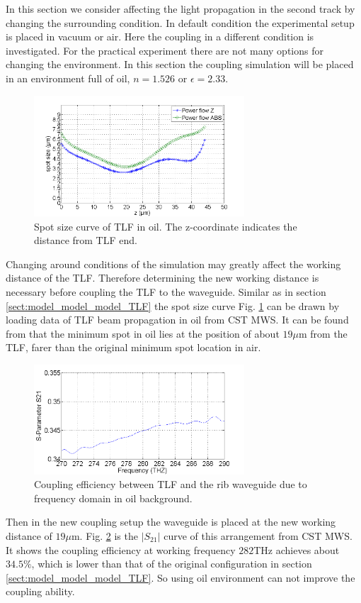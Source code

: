 In this section we consider affecting the light propagation in the second track by changing the surrounding condition. In default condition the experimental setup is placed in vacuum or air. Here the coupling in a different condition is investigated. For the practical experiment there are not many options for changing the environment. In this section the coupling simulation will be placed in an environment full of oil, $n=1.526$ or $\epsilon=2.33$. \\

\begin{figure}[!ht]
\centering
\includegraphics[width=0.7\textwidth]{bilder/spot_curve_oil}
\caption{Spot size curve of TLF in oil. The z-coordinate indicates the distance from TLF end.}
\label{fig:oil_spot_curve}
\end{figure}
Changing around conditions of the simulation may greatly affect the working distance of the TLF. Therefore determining the new working distance is necessary before coupling the TLF to the waveguide.  Similar as in section \ref{sect:model_model_model_TLF} the spot size curve Fig. \ref{fig:oil_spot_curve} can be drawn by loading data of TLF beam propagation in oil from CST MWS. It can be found from that the minimum spot in oil lies at the position of about $19\mu$m from the TLF, farer than the original minimum spot location in air.\\    
\begin{figure}[!ht]
\centering
\includegraphics[width=0.7\textwidth]{bilder/s21_oil_curve}
\caption{Coupling efficiency between TLF and the rib waveguide due to frequency domain in oil background. }
\label{fig:oil_coupling_curve}
\end{figure}

Then in the new coupling setup the waveguide is placed at the new working distance of $19\mu$m. Fig. \ref{fig:oil_coupling_curve} is the $|S_{21}|$ curve of this arrangement from CST MWS. It shows the coupling efficiency at working frequency $282$THz achieves about $34.5\%$, which is lower than that of the original configuration in section \ref{sect:model_model_model_TLF}. So using oil environment can not improve the coupling ability.\\

